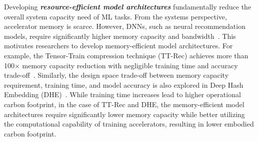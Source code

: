 Developing \textbf{\textit{resource-efficient model architectures}} fundamentally reduce the overall system capacity need of ML tasks.  
From the systems perspective, accelerator memory is scarce. 
However, DNNs, such as neural recommendation models, require significantly higher memory capacity and bandwidth~\cite{Acun:hpca:2021,Ke:isca:2020}. 
This motivates researchers to develop memory-efficient model architectures. For example, the Tensor-Train compression technique (TT-Rec) achieves more than 100$\times$ memory capacity reduction with negligible training time and accuracy trade-off~\cite{yin:mlsys:2021}. Similarly, the design space trade-off between memory capacity requirement, training time, and model accuracy is also explored in Deep Hash Embedding (DHE)~\cite{kang:kdd:2021}. While training time increases lead to higher operational carbon footprint, in the case of TT-Rec and DHE, the memory-efficient model architectures require significantly lower memory capacity while better utilizing the computational capability of training accelerators, resulting in lower embodied carbon footprint. 

